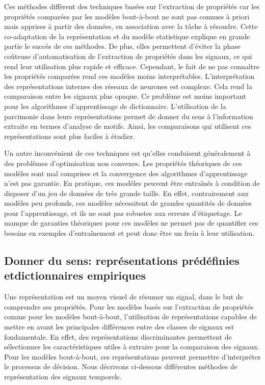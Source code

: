 \documentclass[../thesis.tex]{subfiles}
\begin{document}
	Ces méthodes diffèrent des techniques basées sur l'extraction de propriétés car les propriétés
	comparées par les modèles bout-à-bout ne sont pas connues à priori mais apprises à partir des
	données, en association avec la tâche à résoudre. Cette co-adaptation de la représentation
	et du modèle statistique explique en grande partie le succès de ces méthodes. De plus, elles
	permettent d'éviter la phase coûteuse d'automatisation de l'extraction de propriétés dans
	les signaux, ce qui rend leur utilisation plus rapide et efficace. Cependant, le fait de ne
	pas connaître les propriétés comparées rend ces modèles moins interprétables. L'interprétation
	des représentations internes des réseaux de neurones est complexe. Cela rend la comparaison
	entre les signaux plus opaque. Ce problème est moins important pour les algorithmes
	d'apprentissage de dictionnaire. L'utilisation de la parcimonie dans leurs représentations
	permet de donner du sens à l'information extraite en termes d'analyse de motifs. Ainsi, les
	comparaisons qui utilisent ces représentations sont plus faciles à étudier.


	Un autre inconvénient de ces techniques est qu'elles conduisent généralement à des problèmes
	d'optimisation non convexes. Les propriétés
	théoriques de ces modèles sont mal comprises et la convergence des algorithmes
	d'apprentissage n'est pas garantie. En pratique, ces modèles peuvent être entraînés à
	condition de disposer d'un jeu de données de très grande taille. En effet, contrairement
	aux modèles	peu profonds, ces modèles nécessitent de grandes quantités de données pour
	l'apprentissage, et ils ne sont pas robustes aux erreurs d'étiquetage. Le manque de
	garanties théoriques pour ces modèles ne permet pas de quantifier ces besoins en
	exemples d'entraînement et peut donc être un frein à leur utilisation.







\subsection[Donner du sens: représentations prédéfinies et\\dictionnaires empiriques]{%
			Donner du sens: représentations prédéfinies et\linebreak[1]dictionnaires empiriques}
\label{sub:french:ts_rpz}


	Une représentation est un moyen visuel de résumer un signal, dans le but de comprendre
	ses propriétés. Pour les modèles basés sur l'extraction de propriétés comme pour les
	modèles bout-à-bout, l'utilisation de représentations capables de mettre en avant les
	principales différences entre des classes de signaux est fondamentale. En effet, des
	représentations discriminantes permettent de sélectionner les caractéristiques utiles
	à extraire pour la comparaison des signaux. Pour les modèles bout-à-bout, ces
	représentations peuvent permettre d'interpréter le processus de décision. Nous décrivons
	ci-dessous différentes méthodes de représentation des signaux temporels.
\end{document}
